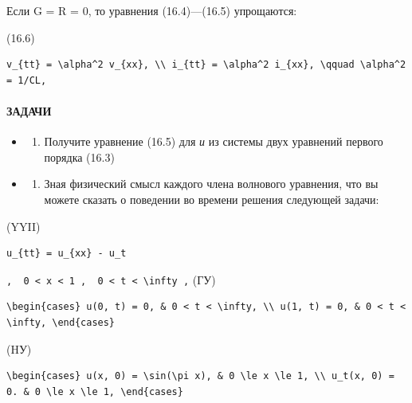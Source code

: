 \documentclass[
  ukrainian,
]{article}
\providecommand{\tightlist}{%
  \setlength{\itemsep}{0pt}\setlength{\parskip}{0pt}}
\begin{document}
Если G = R = 0, то уравнения (16.4)---(16.5) упрощаются:

(16.6)

\begin{verbatim}
v_{tt} = \alpha^2 v_{xx}, \\ i_{tt} = \alpha^2 i_{xx}, \qquad \alpha^2 = 1/CL,
\end{verbatim}

\paragraph{ЗАДАЧИ}\label{ux437ux430ux434ux430ux447ux438-1}

\begin{itemize}
\tightlist
\item
  \begin{enumerate}
  \def\labelenumi{\arabic{enumi}.}
  \tightlist
  \item
    Получите уравнение (16.5) для \emph{и} из системы двух уравнений
    первого порядка (16.3)
  \end{enumerate}
\item
  \begin{enumerate}
  \def\labelenumi{\arabic{enumi}.}
  \setcounter{enumi}{1}
  \tightlist
  \item
    Зная физический смысл каждого члена волнового уравнения, что вы
    можете сказать о поведении во времени решения следующей задачи:
  \end{enumerate}
\end{itemize}

(YYII)

\begin{verbatim}
u_{tt} = u_{xx} - u_t
\end{verbatim}

\texttt{,\ \ \textquotesingle{}0\ \textless{}\ x\ \textless{}\ 1\textquotesingle{}\ ,\ \ \textquotesingle{}0\ \textless{}\ t\ \textless{}\ \textbackslash{}infty\textquotesingle{}\ ,}
(ГУ)

\begin{verbatim}
\begin{cases} u(0, t) = 0, & 0 < t < \infty, \\ u(1, t) = 0, & 0 < t < \infty, \end{cases}
\end{verbatim}

(HУ)

\begin{verbatim}
\begin{cases} u(x, 0) = \sin(\pi x), & 0 \le x \le 1, \\ u_t(x, 0) = 0. & 0 \le x \le 1, \end{cases}
\end{verbatim}
\end{document}
